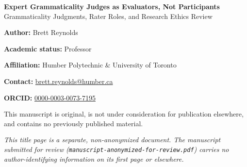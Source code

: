 \documentclass[12pt]{article}
\begin{document}
\begin{center}
  {\Large\bfseries Expert Grammaticality Judges as Evaluators, Not Participants}\\[0.5em]
  {\large Grammaticality Judgments, Rater Roles, and Research Ethics Review}
\end{center}

\vspace{2.5em}

\noindent\textbf{Author:} Brett Reynolds 

\medskip
\noindent\textbf{Academic status:} Professor

\medskip
\noindent\textbf{Affiliation:} Humber Polytechnic \& University of Toronto

\medskip
\noindent\textbf{Contact:} \href{mailto:brett.reynolds@humber.ca}{brett.reynolds@humber.ca}

\medskip
\noindent\textbf{ORCID:} \href{https://orcid.org/0000-0003-0073-7195}{0000-0003-0073-7195}

\vspace{2.5em}

\noindent This manuscript is original, is not under consideration for publication
elsewhere, and contains no previously published material.

\vfill

\noindent\textit{This title page is a separate, non-anonymized document. The
manuscript submitted for review (\texttt{manuscript-anonymized-for-review.pdf})
carries no author-identifying information on its first page or elsewhere.}
\end{document}
